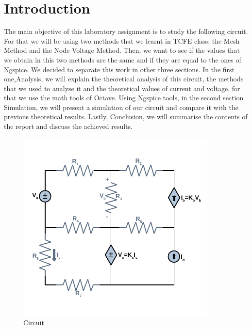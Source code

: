 \section{Introduction}
\label{sec:introduction}

\par The main objective of this laboratory assignment is to study the following circuit. For that we will be using two methods that we learnt in TCFE class: the Mesh Method and the Node Voltage Method. Then, we want to see if the values that we obtain in this two methods are the same and if they are equal to the ones of Ngspice. We decided to separate this work in other three sections. In the first one,Analysis, we will explain the theoretical analysis of this circuit, the methods that we used to analyse it  and the theoretical values of current and voltage, for that we use the math tools of Octave. Using Ngspice tools, in the second section Simulation, we will present a simulation of our circuit and compare it with the previous theoretical results. Lastly, Conclusion, we will summarise the contents of the report and discuss the achieved results.

\begin{figure}[h] \centering
\includegraphics[width=0.8\linewidth]{Circuit.pdf}
\caption{Circuit}
\label{fig:circuit}
\end{figure}
